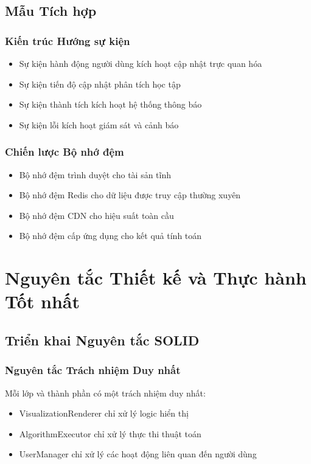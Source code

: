 \subsection{Mẫu Tích hợp}

\subsubsection{Kiến trúc Hướng sự kiện}
\begin{itemize}
    \item Sự kiện hành động người dùng kích hoạt cập nhật trực quan hóa
    \item Sự kiện tiến độ cập nhật phân tích học tập
    \item Sự kiện thành tích kích hoạt hệ thống thông báo
    \item Sự kiện lỗi kích hoạt giám sát và cảnh báo
\end{itemize}

\subsubsection{Chiến lược Bộ nhớ đệm}
\begin{itemize}
    \item Bộ nhớ đệm trình duyệt cho tài sản tĩnh
    \item Bộ nhớ đệm Redis cho dữ liệu được truy cập thường xuyên
    \item Bộ nhớ đệm CDN cho hiệu suất toàn cầu
    \item Bộ nhớ đệm cấp ứng dụng cho kết quả tính toán
\end{itemize}

\section{Nguyên tắc Thiết kế và Thực hành Tốt nhất}
\label{sec:design-principles}

\subsection{Triển khai Nguyên tắc SOLID}

\subsubsection{Nguyên tắc Trách nhiệm Duy nhất}
Mỗi lớp và thành phần có một trách nhiệm duy nhất:
\begin{itemize}
    \item VisualizationRenderer chỉ xử lý logic hiển thị
    \item AlgorithmExecutor chỉ xử lý thực thi thuật toán
    \item UserManager chỉ xử lý các hoạt động liên quan đến người dùng
\end{itemize}

